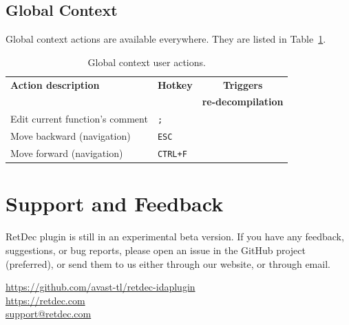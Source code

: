 \documentclass[pdftex, a4paper,12pt, oneside, svgnames]{article}
\newcommand{\xmark}{\ding{55}}%
\begin{document}
\subsection{Global Context}
Global context actions are available everywhere. They are listed in Table~\ref{table:global-context}.

\begin{table}[!ht]
\centering
\caption{Global context user actions.}
\label{table:global-context}
\begin{tabular}{llc}
\textbf{Action description} & \textbf{Hotkey} & \textbf{Triggers}\\
& & \textbf{re-decompilation}\\
\hline
Edit current function's comment & \texttt{;} & \xmark \\
Move backward (navigation) & \texttt{ESC} & \xmark \\
Move forward (navigation) & \texttt{CTRL+F} & \xmark
\end{tabular}
\end{table}

\section{Support and Feedback}
\label{sec:support}
RetDec plugin is still in an experimental beta version. If you have any feedback, suggestions, or bug reports, please open an issue in the GitHub project (preferred), or send them to us either through our website, or through email.
\begin{center}
{
\LARGE
\href{https://github.com/avast-tl/retdec-idaplugin}{https://github.com/avast-tl/retdec-idaplugin} \\[5 mm]
\href{https://retdec.com}{https://retdec.com} \\[5 mm]
\href{mailto:support@retdec.com}{support@retdec.com}
}
\end{center}

\end{document}
